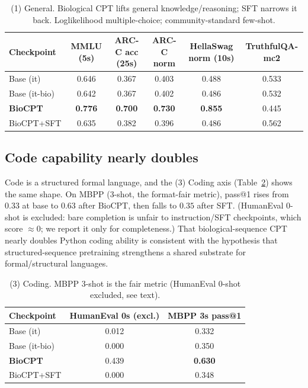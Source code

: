 \begin{table}[t]\centering\small
\caption{(1) General. Biological CPT lifts general knowledge/reasoning; SFT narrows it back.
Loglikelihood multiple-choice; community-standard few-shot.}
\label{tab:general}
\begin{tabular}{lccccc}
\toprule
Checkpoint & MMLU (5s) & ARC-C acc (25s) & ARC-C norm & HellaSwag norm (10s) & TruthfulQA-mc2 \\
\midrule
Base (it)        & 0.646 & 0.367 & 0.403 & 0.488 & 0.533 \\
Base (it-bio)    & 0.642 & 0.367 & 0.402 & 0.486 & 0.532 \\
\textbf{BioCPT}  & \textbf{0.776} & \textbf{0.700} & \textbf{0.730} & \textbf{0.855} & 0.445 \\
BioCPT+SFT       & 0.635 & 0.382 & 0.396 & 0.486 & 0.562 \\
\bottomrule
\end{tabular}
\end{table}

\subsection{Code capability nearly doubles}
Code is a structured formal language, and the (3) Coding axis (Table~\ref{tab:coding}) shows the
same shape. On MBPP (3-shot, the format-fair metric), pass@1 rises from $0.33$ at base to
$\mathbf{0.63}$ after BioCPT, then falls to $0.35$ after SFT. (HumanEval 0-shot is excluded:
bare completion is unfair to instruction/SFT checkpoints, which score ${\approx}0$; we report
it only for completeness.) That biological-sequence CPT nearly doubles Python coding ability is
consistent with the hypothesis that structured-sequence pretraining strengthens a shared
substrate for formal/structural languages.

\begin{table}[h]\centering\small
\caption{(3) Coding. MBPP 3-shot is the fair metric (HumanEval 0-shot excluded, see text).}
\label{tab:coding}
\begin{tabular}{lcc}
\toprule
Checkpoint & HumanEval 0s (excl.) & \textbf{MBPP 3s pass@1} \\
\midrule
Base (it)        & 0.012 & 0.332 \\
Base (it-bio)    & 0.000 & 0.350 \\
\textbf{BioCPT}  & 0.439 & \textbf{0.630} \\
BioCPT+SFT       & 0.000 & 0.348 \\
\bottomrule
\end{tabular}
\end{table}


